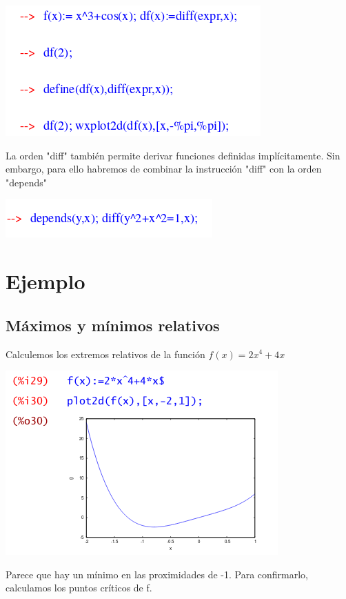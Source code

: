 \documentclass{article}
\begin{document}
\begin{itemize}
\begin{center}
\includegraphics[scale=0.5]{Act94.png}
\end{center}
La orden "diff" también permite derivar funciones definidas implícitamente. Sin embargo, para ello habremos de combinar la instrucción "diff" con la orden "depends"
\begin{center}
\includegraphics[scale=0.5]{Act95.png}
\end{center}

\section{Ejemplo}
\subsection*{Máximos y mínimos relativos}
Calculemos los extremos relativos de la función $f(x)=2x^{4}+4x$
\begin{center}
\includegraphics[scale=0.5]{Act96.png}
\end{center}

Parece que hay un mínimo en las proximidades de -1. Para confirmarlo, calculamos los puntos críticos de f.


\end{itemize}
\end{document}
